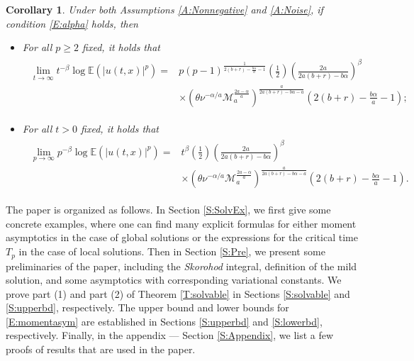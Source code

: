 \documentclass[a4paper,11pt]{article}
\numberwithin{equation}{section}
\numberwithin{equation}{section}
\theoremstyle{plain}
\newtheorem{corollary}[theorem]{Corollary}
\theoremstyle{definition}
\newcommand{\E}{\mathbb{E}}
\begin{document}
\begin{corollary} \label{C:Lim}
  Under both Assumptions \ref{A:Nonnegative} and \ref{A:Noise}, if condition \eqref{E:alpha} holds,
  then
  \begin{itemize}
    \item[(1)] For all $p\ge 2$ fixed, it holds that
  \begin{align}
    \label{E:momentasym-t}
    \begin{aligned}
      \lim_{t \to \infty} t^{-\beta} \log \E\left(|u(t,x)|^p\right) =
      & p(p-1)^{\frac{1}{2(b+r)-\frac{b\alpha}{a} -1}} \left(\frac{1}{2}\right)\left(\frac{2a}{2a(b+r)- b\alpha} \right)^\beta \\
      & \times \left(\theta\nu^{-\alpha/a} \mathcal{M}_a^{\frac{2a-\alpha}{a}}\right)^{\frac{a}{2a(b+r)-b\alpha-a}}\left(2(b+r)-\frac{b\alpha}{a}-1\right);
    \end{aligned}
  \end{align}
  \item[(2)] For all $t>0$ fixed, it holds that
  \begin{align}
    \label{E:momentasym-p}
    \begin{aligned}
      \lim_{p \to \infty} p^{-\beta} \log \E\left(|u(t,x)|^p\right) =
      & t^\beta \left(\frac{1}{2}\right)\left(\frac{2a}{2a(b+r)- b\alpha} \right)^\beta \\
      & \times \left(\theta\nu^{-\alpha/a} \mathcal{M}_a^{\frac{2a-\alpha}{a}}\right)^{\frac{a}{2a(b+r)-b\alpha-a}}\left(2(b+r)-\frac{b\alpha}{a}-1\right).
    \end{aligned}
  \end{align}
  \end{itemize}
\end{corollary}

\bigskip

The paper is organized as follows. In Section \ref{S:SolvEx}, we first give some concrete examples,
where one can find many explicit formulas for either moment asymptotics in the case of global
solutions or the expressions for the critical time $T_p$ in the case of local solutions. Then in
Section \ref{S:Pre}, we present some preliminaries of the paper, including the {\it Skorohod}
integral, definition of the mild solution, and some asymptotics with corresponding variational
constants. We prove part (1) and part (2) of Theorem \ref{T:solvable} in Sections \ref{S:solvable}
and \ref{S:upperbd}, respectively.  The upper bound and lower bounds for \eqref{E:momentasym} are
established in Sections \ref{S:upperbd} and \ref{S:lowerbd}, respectively. Finally, in the appendix
--- Section \ref{S:Appendix}, we list a few proofs of results that are used in the paper.
\end{document}
